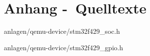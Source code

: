 
\clearpage
\chapter{Anhang -\ Quelltexte}


                {anlagen/qemu-device/stm32f429_soc.h}

                {anlagen/qemu-device/stm32f429_gpio.h}
